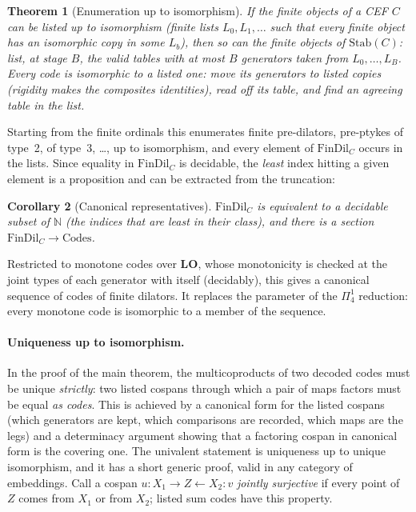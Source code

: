 \documentclass[11pt]{article}
\newtheorem{theorem}{Theorem}[section]
\newtheorem{corollary}[theorem]{Corollary}
\theoremstyle{definition}
\theoremstyle{remark}
\newcommand{\Stab}{\mathrm{Stab}}
\newcommand{\LO}{\mathbf{LO}}
\begin{document}
\begin{theorem}[Enumeration up to isomorphism]
If the finite objects of a CEF $C$ can be listed up to isomorphism (finite
lists $L_0,L_1,\ldots$ such that every finite object has an isomorphic copy
in some $L_b$), then so can the finite objects of $\Stab(C)$: list, at
stage $B$, the valid tables with at most $B$ generators taken from
$L_0,\ldots,L_B$. Every code is isomorphic to a listed one: move its
generators to listed copies (rigidity makes the composites identities),
read off its table, and find an agreeing table in the list.
\end{theorem}

Starting from the finite ordinals this enumerates finite pre-dilators,
pre-ptykes of type~2, of type~3, \dots, up to isomorphism, and every element
of $\mathrm{FinDil}_C$ occurs in the lists. Since equality in
$\mathrm{FinDil}_C$ is decidable, the \emph{least} index hitting a given
element is a proposition and can be extracted from the truncation:

\begin{corollary}[Canonical representatives]
$\mathrm{FinDil}_C$ is equivalent to a decidable subset of $\mathbb{N}$
(the indices that are least in their class), and there is a section
$\mathrm{FinDil}_C\to\mathrm{Codes}$.
\end{corollary}

Restricted to monotone codes over $\LO$, whose monotonicity is checked at the
joint types of each generator with itself (decidably), this gives a
canonical sequence of codes of finite dilators. It replaces the parameter
of the $\Pi^1_4$ reduction: every monotone code is isomorphic to a member of
the sequence.

\paragraph{Uniqueness up to isomorphism.} In the proof of the main theorem,
the multicoproducts of two decoded codes must be unique \emph{strictly}:
two listed cospans through which a pair of maps factors must be equal
\emph{as codes}. This is achieved by a canonical form for the listed
cospans (which generators are kept, which comparisons are recorded, which
maps are the legs) and a determinacy argument showing that a factoring
cospan in canonical form is the covering one. The univalent statement is
uniqueness up to unique isomorphism, and it has a short generic proof, valid
in any category of embeddings. Call a cospan $u:X_1\to Z\leftarrow X_2:v$
\emph{jointly surjective} if every point of $Z$ comes from $X_1$ or from
$X_2$; listed sum codes have this property.
\end{document}
